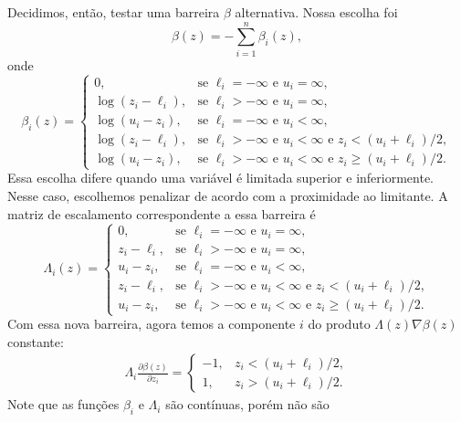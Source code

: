Decidimos, então, testar uma barreira $\beta$ alternativa. Nossa escolha foi
$$\beta(z) = -\sum_{i=1}^n\beta_i(z),$$
onde
\begin{equation}
 \beta_i(z) = \left\{
\begin{array}{ll}
 0,              &  \mbox{se } \ell_i = -\infty \mbox{ e } u_i = \infty, \\
 \log(z_i - \ell_i),&  \mbox{se } \ell_i > -\infty \mbox{ e } u_i = \infty, \\
 \log(u_i - z_i),&  \mbox{se } \ell_i = -\infty \mbox{ e } u_i < \infty, \\
 \log(z_i - \ell_i),&  \mbox{se } \ell_i > -\infty \mbox{ e } u_i < \infty \mbox{ e } 
z_i < (u_i + \ell_i)/2, \\
 \log(u_i - z_i),&  \mbox{se } \ell_i > -\infty \mbox{ e } u_i < \infty \mbox{ e } 
z_i \geq (u_i + \ell_i)/2.
\end{array}
\right.
\end{equation}
Essa escolha difere quando uma variável é limitada superior e inferiormente.
Nesse caso, escolhemos penalizar de acordo com a proximidade ao limitante.
A matriz de escalamento correspondente a essa barreira é
\begin{equation}
 \Lambda_i(z) = \left\{
\begin{array}{ll}
 0,         & \mbox{se } \ell_i = -\infty \mbox{ e } u_i = \infty, \\
 z_i - \ell_i, & \mbox{se } \ell_i > -\infty \mbox{ e } u_i = \infty, \\
 u_i - z_i, & \mbox{se } \ell_i = -\infty \mbox{ e } u_i < \infty, \\
 z_i - \ell_i, & \mbox{se } \ell_i > -\infty \mbox{ e } u_i < \infty \mbox{ e } 
z_i < (u_i + \ell_i)/2, \\
 u_i - z_i, & \mbox{se } \ell_i > -\infty \mbox{ e } u_i < \infty \mbox{ e } 
z_i \geq (u_i + \ell_i)/2.
\end{array}
\right.
\end{equation}
Com essa nova barreira, agora temos a componente $i$ do produto $\Lambda(z)\nabla \beta(z)$ 
constante:
\begin{eqnarray*}
\Lambda_i\frac{\partial \beta(z)}{\partial z_i} = 
\left\{
\begin{array}{ll}
 -1, & z_i < (u_i + \ell_i)/2, \\
  1, & z_i > (u_i + \ell_i)/2.
\end{array}\right.
\end{eqnarray*}
Note que as funções $\beta_i$ e $\Lambda_i$ são contínuas, porém não são
